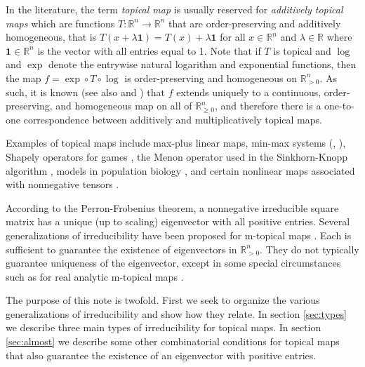 \documentclass[10pt,reqno]{amsart}
\newcommand{\R}{\mathbb{R}}
\theoremstyle{plain}
\theoremstyle{definition}
\numberwithin{equation}{section}
\begin{document}
In the literature, the term \emph{topical map} is usually reserved for \emph{additively topical maps} which are functions $T: \R^n \rightarrow \R^n$ that are order-preserving and additively homogeneous, that is $T(x + \lambda \mathbf{1}) = T(x) + \lambda \mathbf{1}$ for all $x \in \R^n$ and $\lambda \in \R$ where $\mathbf{1} \in \R^n$ is the vector with all entries equal to 1.  Note that if $T$ is topical and $\log$ and $\exp$ denote the entrywise natural logarithm and exponential functions, then the map  $f = \exp \circ T \circ \log$ is order-preserving and homogeneous on $\R^n_{>0}$. As such, it is known \cite[Corollary 2]{BurbanksSparrow99} (see also \cite[Corollary 4.6]{BurbanksNussbaumSparrow03} and \cite[Theorem 5.1.5]{LemmensNussbaum}) that $f$ extends uniquely to a continuous, order-preserving, and homogeneous map on all of $\R^n_{\ge 0}$, and therefore there is a one-to-one correspondence between additively and multiplicatively topical maps. 

Examples of topical maps include max-plus linear maps, min-max systems (\cite{Gunawardena04}, \cite{YaZh04}), Shapely operators for games \cite{AkianGaubertHochart20}, the Menon operator used in the Sinkhorn-Knopp algorithm \cite{BrualdiParterScheider66}, models in population biology \cite{Nussbaum89}, and certain nonlinear maps associated with nonnegative tensors \cite{ChPeZh08, FriedlandGaubertHan13, HuQi16, Lins23}. 
 
According to the Perron-Frobenius theorem, a nonnegative irreducible square matrix has a unique (up to scaling) eigenvector with all positive entries.  Several generalizations of irreducibility have been proposed for m-topical maps \cite{Morishima64, SchneiderTurner72, Oshime83, GaubertGunawardena04}.  Each is sufficient to guarantee the existence of eigenvectors in $\R^n_{>0}$. They do not typically guarantee uniqueness of the eigenvector, except in some special circumstances such as for real analytic m-topical maps \cite[Theorem 5.1]{Lins23}.  %


The purpose of this note is twofold.  First we seek to organize the various generalizations of irreducibility and show how they relate. In section \ref{sec:types} we describe three main types of irreducibility for topical maps.  In section \ref{sec:almost} we describe some other combinatorial conditions for topical maps that also guarantee the existence of an eigenvector with positive entries. 
\end{document}
